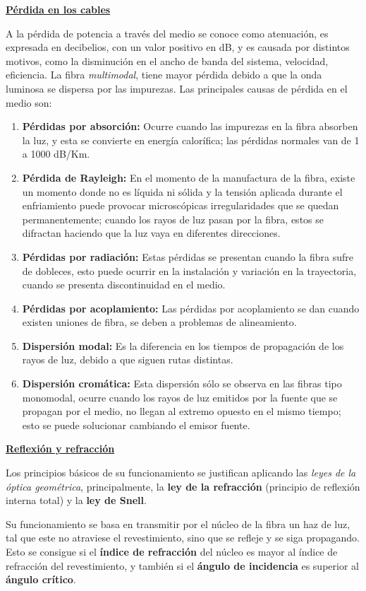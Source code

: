 \documentclass[10pt,a4paper]{article}
\begin{document}
\underline{\textbf{Pérdida en los cables}}

A la pérdida de potencia a través del medio se conoce como atenuación, es expresada en decibelios, con un valor positivo en dB, y es causada por distintos motivos, como la disminución en el ancho de banda del sistema, velocidad, eficiencia. La fibra \textit{multimodal}, tiene mayor pérdida debido a que la onda luminosa se dispersa por las impurezas. Las principales causas de pérdida en el medio son:
\begin{enumerate}[+]
\item \textbf{Pérdidas por absorción:} Ocurre cuando las impurezas en la fibra absorben la luz, y esta se convierte en energía calorífica; las pérdidas normales van de 1 a 1000 dB/Km.
\item \textbf{Pérdida de Rayleigh:} En el momento de la manufactura de la fibra, existe un momento donde no es líquida ni sólida y la tensión aplicada durante el enfriamiento puede provocar microscópicas irregularidades que se quedan permanentemente; cuando los rayos de luz pasan por la fibra, estos se difractan haciendo que la luz vaya en diferentes direcciones.
\item \textbf{Pérdidas por radiación:} Estas pérdidas se presentan cuando la fibra sufre de dobleces, esto puede ocurrir en la instalación y variación en la trayectoria, cuando se presenta discontinuidad en el medio.
\item \textbf{Pérdidas por acoplamiento:} Las pérdidas por acoplamiento se dan cuando existen uniones de fibra, se deben a problemas de alineamiento.
\item \textbf{Dispersión modal:} Es la diferencia en los tiempos de propagación de los rayos de luz, debido a que siguen rutas distintas.
\item \textbf{Dispersión cromática:} Esta dispersión sólo se observa en las fibras tipo monomodal, ocurre cuando los rayos de luz emitidos por la fuente que se propagan por el medio, no llegan al extremo opuesto en el mismo tiempo; esto se puede solucionar cambiando el emisor fuente.
\end{enumerate}

\underline{\textbf{Reflexión y refracción}}

Los principios básicos de su funcionamiento se justifican aplicando las \textit{leyes de la óptica geométrica}, principalmente, la \textbf{ley de la refracción} (principio de reflexión interna total) y la \textbf{ley de Snell}.

Su funcionamiento se basa en transmitir por el núcleo de la fibra un haz de luz, tal que este no atraviese el revestimiento, sino que se refleje y se siga propagando. Esto se consigue si el \textbf{índice de refracción} del núcleo es mayor al índice de refracción del revestimiento, y también si el \textbf{ángulo de incidencia} es superior al \textbf{ángulo crítico}.
\end{document}
